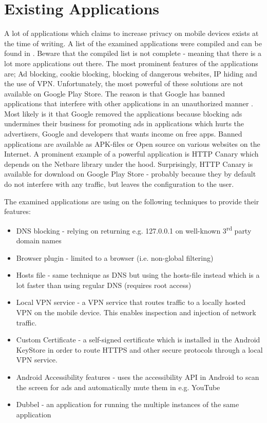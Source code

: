 \documentclass[main.tex]{subfiles}
\begin{document}
\section{Existing Applications}
A lot of applications which claims to increase privacy on mobile devices exists at the time of writing. A list of the examined applications were compiled and can be found in . Beware that the compiled list is not complete - meaning that there is a lot more applications out there. The most prominent features of the applications are; Ad blocking, cookie blocking, blocking of dangerous websites, IP hiding and the use of VPN. Unfortunately, the most powerful of these solutions are not available on Google Play Store. The reason is that Google has banned applications that interfere with other applications in an unauthorized manner \cite{WladimirPalantAdblockStore}. Most likely is it that Google removed the applications because blocking ads undermines their business for promoting ads in applications which hurts the advertisers, Google and developers that wants income on free apps. Banned applications are available as APK-files or Open source on various websites on the Internet. A prominent example of a powerful application is HTTP Canary \cite{GuoShiHttpCanaryPlay} which depends on the Netbare library \cite{MagatronKingMegatronKing/NetBare:Android} under the hood. Surprisingly, HTTP Canary is available for download on Google Play Store - probably because they by default do not interfere with any traffic, but leaves the configuration to the user.

The examined applications are using on the following techniques to provide their features:
\begin{itemize}
    \item DNS blocking - relying on returning e.g. 127.0.0.1 on well-known 3\textsuperscript{rd} party domain names
    \item Browser plugin - limited to a browser (i.e. non-global filtering)
    \item Hosts file - same technique as DNS but using the hosts-file instead which is a lot faster than using regular DNS (requires root access)
    \item Local VPN service - a VPN service that routes traffic to a locally hosted VPN on the mobile device. This enables inspection and injection of network traffic.
    \item Custom Certificate - a self-signed certificate which is installed in the Android KeyStore in order to route HTTPS and other secure protocols through a local VPN service.
    \item Android Accessibility features - uses the accessibility API in Android to scan the screen for ads and automatically mute them in e.g. YouTube
    \item Dubbel - an application for running the multiple instances of the same application
\end{itemize}
\end{document}
